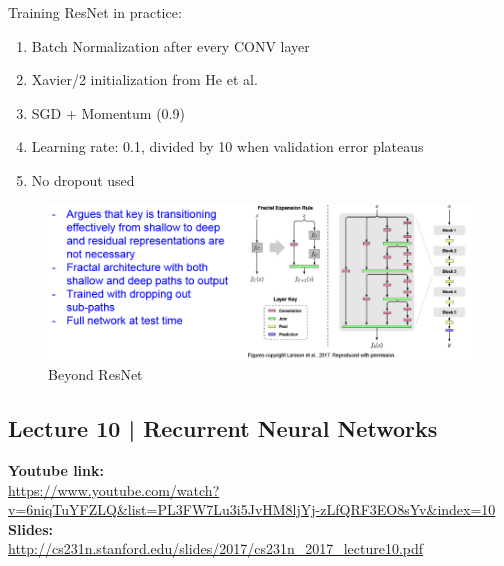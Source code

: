 \documentclass[11pt]{article}
\begin{document}
Training ResNet in practice:
\begin{enumerate}
    \item Batch Normalization after every CONV layer
    \item Xavier/2 initialization from He et al.
    \item SGD + Momentum (0.9)
    \item Learning rate: 0.1, divided by 10 when validation error plateaus
    \item No dropout used
\end{enumerate}{}
\clearpage
\begin{figure}[h]
\centering
\captionsetup{justification=centering}
\includegraphics[width=0.9\linewidth]{L818.pdf}
\caption{ Beyond ResNet}
\label{fig:L818}
\end{figure}
\clearpage
\subsection{Lecture 10 | Recurrent Neural Networks}
\textbf{Youtube link:}\\
\url{https://www.youtube.com/watch?v=6niqTuYFZLQ&list=PL3FW7Lu3i5JvHM8ljYj-zLfQRF3EO8sYv&index=10}\\
\textbf{Slides:}\\
\url{http://cs231n.stanford.edu/slides/2017/cs231n_2017_lecture10.pdf}
\end{document}
